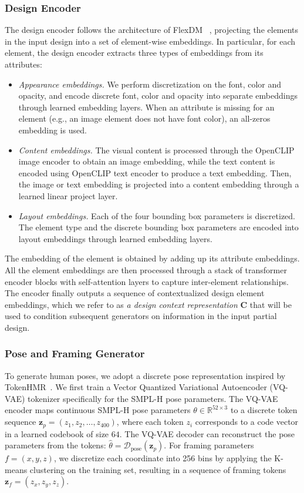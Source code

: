 \subsubsection{Design Encoder}
The design encoder follows the architecture of FlexDM ~\cite{flexdm}, projecting the elements in the input design into a set of element-wise embeddings.
In particular, for each element, 
the design encoder extracts three types of embeddings from its attributes:
\begin{itemize}
    \item \textit{Appearance embeddings.} We perform discretization on the font, color and opacity, and encode discrete font, color and opacity into separate embeddings 
    through learned embedding layers. 
    When an attribute is missing for an element (e.g., an image element does not have font color), an all-zeros embedding is used.

    \item \textit{Content embeddings.} The visual content is processed through the OpenCLIP~\cite{OpenCLIP} image encoder to obtain an image embedding, while the text content is encoded using OpenCLIP text encoder to produce a text embedding. Then, the image or text embedding is projected into a content embedding through a learned linear project layer.

    \item \textit{Layout embeddings.}
    Each of the four bounding box parameters is discretized. The element type and the discrete bounding box parameters are encoded into layout embeddings through learned embedding layers.
\end{itemize}

The embedding of the element is obtained by adding up its attribute embeddings.
All the element embeddings 
are then processed through a stack of transformer encoder blocks with self-attention layers
to capture inter-element relationships. The encoder finally outputs a sequence of contextualized design element embeddings, 
which we refer to as 
\textit{a design context representation} $\mathbf{C}$ that will be used to condition subsequent generators on information in the input partial design. 

\subsubsection{Pose and Framing Generator}

To generate human poses, we adopt a discrete pose representation inspired by TokenHMR~\cite{tokenhmr}. We first train a Vector Quantized Variational Autoencoder (VQ-VAE) tokenizer specifically for the SMPL-H pose parameters.
The VQ-VAE encoder maps continuous SMPL-H pose parameters $\theta \in \mathbb{R}^{52 \times 3}$ to a discrete token sequence $\mathbf{z}_p = (z_1, z_2, \ldots, z_{400})$, where each token $z_i$ corresponds to a code vector in a learned codebook of size $64$. The VQ-VAE decoder can reconstruct the pose parameters from the tokens: $\hat{\theta} = \mathcal{D}_\text{pose}(\mathbf{z}_p)$.
For framing parameters $f = (x, y, z)$, we discretize each coordinate into 256 bins by applying the K-means clustering on the training set, resulting in a sequence of framing tokens $\mathbf{z}_f = (z_x, z_y, z_z)$.

